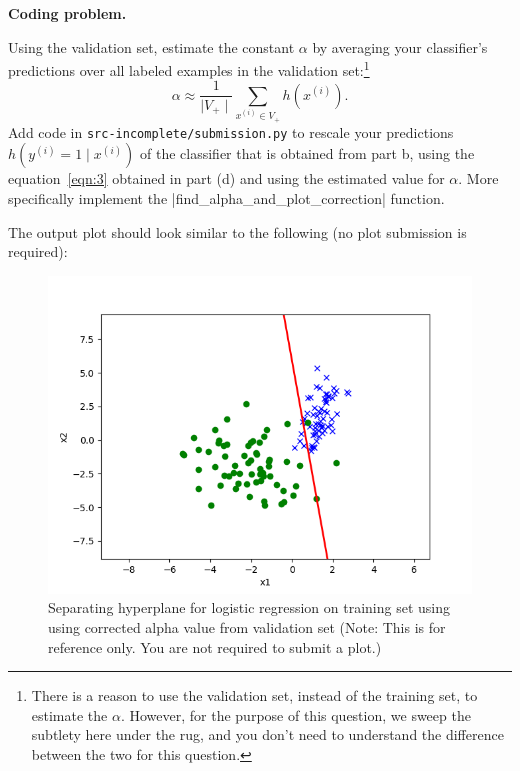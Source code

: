 \item {} \textbf{Coding problem.}

Using the validation set, estimate the constant $\alpha$ by averaging your
classifier's predictions over all labeled examples in the validation set:\footnote{There is a reason to use the validation set, instead of the training set, to estimate the $\alpha$. However, for the purpose of this question, we sweep the subtlety here under the rug, and you don't need to understand the difference between the two for this question. } 
%
\begin{equation*}
  \alpha \approx \frac{1}{\mid V_{+} \mid}\sum_{x^{(i)}\in V_{+}} h(x^{(i)}).
\end{equation*}
%
Add code in \texttt{src-incomplete/submission.py} to rescale your
 predictions $h(y^{(i)}=1\mid x^{(i)})$ of the classifier that is obtained from part b,  using the equation~\eqref{eqn:3} obtained in part (d) and using the estimated value for $\alpha$. 
More specifically implement the |find_alpha_and_plot_correction| function.

 The output plot should look similar to the following (no plot submission is required):
 \begin{figure}[H]
   \centering
   \vspace{2mm}
   \includegraphics[width=0.5\linewidth]{02-posonly/posonly_adjusted_pred.png}
     \caption{Separating hyperplane for logistic regression on training set using using corrected alpha value from validation set (Note: This is for reference only.  You are not required to submit a plot.)}
 \end{figure}


